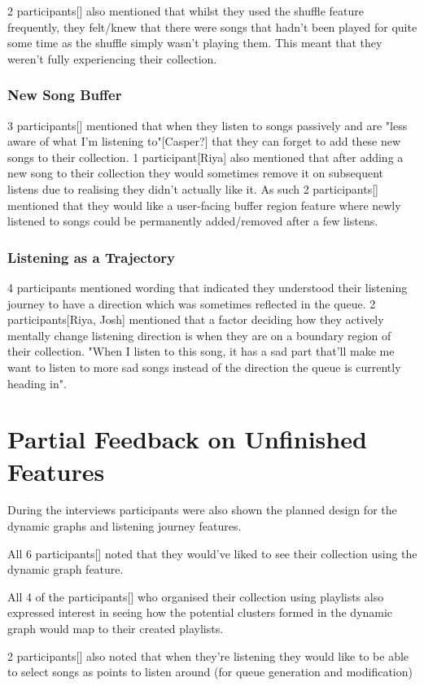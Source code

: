 2 participants[] also mentioned that whilst they used the shuffle feature frequently, they felt/knew that there were songs that hadn't been played for quite some time as the shuffle simply wasn't playing them. This meant that they weren't fully experiencing their collection.

\subsubsection{New Song Buffer}
3 participants[] mentioned that when they listen to songs passively and are "less aware of what I'm listening to"[Casper?] that they can forget to add these new songs to their collection. 1 participant[Riya] also mentioned that after adding a new song to their collection they would sometimes remove it on subsequent listens due to realising they didn't actually like it. As such 2 participants[] mentioned that they would like a user-facing buffer region feature where newly listened to songs could be permanently added/removed after a few listens.%

\subsubsection{Listening as a Trajectory}
4 participants mentioned wording that indicated they understood their listening journey to have a direction which was sometimes reflected in the queue. 2 participants[Riya, Josh] mentioned that a factor deciding how they actively mentally change listening direction is when they are on a boundary region of their collection. "When I listen to this song, it has a sad part that'll make me want to listen to more sad songs instead of the direction the queue is currently heading in".

\section{Partial Feedback on Unfinished Features}
During the interviews participants were also shown the planned design for the dynamic graphs and listening journey features.

All 6 participants[] noted that they would've liked to see their collection using the dynamic graph feature.

All 4 of the participants[] who organised their collection using playlists also expressed interest in seeing how the potential clusters formed in the dynamic graph would map to their created playlists.

2 participants[] also noted that when they're listening they would like to be able to select songs as points to listen around (for queue generation and modification)